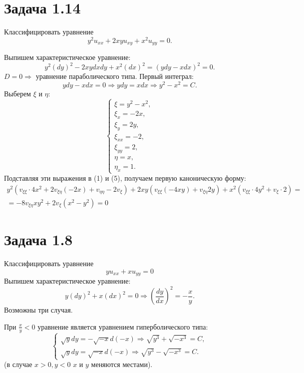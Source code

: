 \documentclass[11pt]{article}
\begin{document}
\section{Задача 1.14}
\label{sec:orgabfc0ce}
Классифицировать уравнение
\begin{equation}
y^2u_{xx} + 2xyu_{xy} + x^2u_{yy} = 0.
\end{equation}

Выпишем характеристическое уравнение:
\begin{equation}
y^2(dy)^2 - 2xydxdy + x^2(dx)^2 = (ydy - xdx)^2 = 0.
\end{equation}
$D = 0 \Rightarrow$ уравнение параболического типа. Первый интеграл:
\begin{equation*}
ydy - xdx = 0 \Rightarrow ydy = xdx \Rightarrow y^2 - x^2 = C.
\end{equation*}
Выберем $\xi$ и $\eta$:
\begin{equation}
\begin{cases}
\xi = y^2 - x^2, \\
\xi_x = -2x, \\
\xi_y = 2y, \\
\xi_{xx} = -2, \\
\xi_{yy} = 2, \\
\eta = x, \\
\eta_x = 1.
\end{cases}
\end{equation}
Подставляя эти выражения в (1) и (5), получаем первую каноническую форму:
\begin{multline}
y^2(v_{\xi\xi}\cdot4x^2 + 2v_{\xi\eta}(-2x) + v_{\eta\eta} - 2v_{\xi}) + 2xy(v_{\xi\xi}(-4xy) +
v_{\xi\eta}2y) + x^2(v_{\xi\xi}\cdot4y^2 + v_{\xi}\cdot2) = \\
= -8v_{\xi\eta}xy^2 + 2v_{\xi}(x^2 - y^2) = 0
\end{multline}

\section{Задача 1.8}
\label{sec:orgb2508f1}
Классифицировать уравнение
\begin{equation}
yu_{xx} + xu_{yy} = 0
\end{equation}
Выпишем характеристическое уравнение:
\begin{equation}
y(dy)^2 + x(dx)^2 = 0 \Rightarrow \left(\frac{dy}{dx}\right)^2 = -\frac{x}y.
\end{equation}
Возможны три случая.

При $\frac{x}y < 0$ уравнение является уравнением гиперболического типа:
\begin{equation*}
\begin{cases}
\sqrt{y}dy = -\sqrt{-x}d(-x) \Rightarrow \sqrt{y^3} + \sqrt{-x^3} = C, \\
\sqrt{y}dy = \sqrt{-x}d(-x) \Rightarrow \sqrt{y^3} - \sqrt{-x^3} = C.
\end{cases}
\end{equation*}
(в случае $x > 0, y < 0$ $x$ и $y$ меняются местами).
\end{document}
